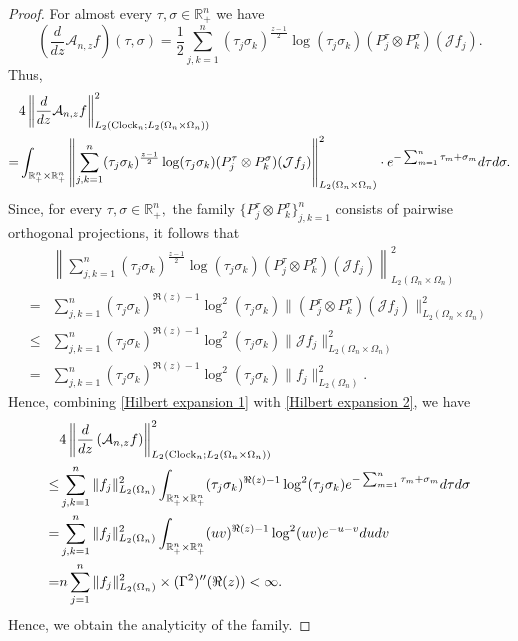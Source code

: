 \documentclass{amsart}
\numberwithin{equation}{section}
\theoremstyle{definition}
\theoremstyle{remark}
\newcommand{\1}{\mathbf 1}
\begin{document}
\begin{proof}
For almost every $\tau,\sigma\in \mathbb{R}^n_+$ we have
$$\left(\frac{d}{dz}\mathcal{A}_{n,z}f\right)(\tau,\sigma)=\frac12\sum_{j,k=1}^n(\tau_j\sigma_k)^{\frac{z-1}{2}}\log(\tau_j\sigma_k)(P_j^{\tau}\otimes P_k^{\sigma})(\mathcal{J}f_j).$$
Thus,
\begin{equation}\label{Hilbert expansion 1}
\begin{split}
&4\left\|\frac{d}{dz}\mathcal{A}_{n,z}f\right\|_{L_2({\rm Clock}_n;L_2(\Omega_n\times\Omega_n))}^2\\
=&\int_{\mathbb{R}^{n}_{+}\times \mathbb{R}^{n}_{+}}\left\|\sum_{j,k=1}^n(\tau_j\sigma_k)^{\frac{z-1}{2}}\log(\tau_j\sigma_k)(P_j^{\tau}\otimes P_k^{\sigma})(\mathcal{J}f_j)\right\|_{L_2(\Omega_n\times\Omega_n)}^{2}\cdot e^{-\sum_{m=1}^n\tau_m+\sigma_m}d\tau d\sigma.
\end{split}
\end{equation}
Since, for every $\tau,\sigma\in\mathbb{R}^n_+,$ the family $\{P^{\tau}_j\otimes P^{\sigma}_k\}_{j,k=1}^n$ consists of pairwise orthogonal projections, it follows that
\begin{equation}\label{Hilbert expansion 2}
\begin{split}
&\left\|\sum_{j,k=1}^n(\tau_j\sigma_k)^{\frac{z-1}{2}}\log(\tau_j\sigma_k)(P_j^{\tau}\otimes P_k^{\sigma})(\mathcal{J}f_j)\right\|_{L_2(\Omega_n\times\Omega_n)}^{2}\\
=&\sum_{j,k=1}^n(\tau_j\sigma_k)^{\Re(z)-1}\log^2(\tau_j\sigma_k)\|(P_j^{\tau}\otimes P_k^{\sigma})(\mathcal{J}f_j)\|_{L_2(\Omega_n\times\Omega_n)}^2\\
\leq &\sum_{j,k=1}^n(\tau_j\sigma_k)^{\Re(z)-1}\log^2(\tau_j\sigma_k)\|\mathcal{J}f_j\|_{L_2(\Omega_n\times\Omega_n)}^2\\
=&\sum_{j,k=1}^n(\tau_j\sigma_k)^{\Re(z)-1}\log^2(\tau_j\sigma_k)\|f_j\|_{L_2(\Omega_n)}^{2}.
\end{split}
\end{equation}
Hence, combining \eqref{Hilbert expansion 1} with \eqref{Hilbert expansion 2}, we have
\begin{align*}
&4\left\|\frac{d}{dz}\left(\mathcal{A}_{n,z}f\right)\right\|_{L_2({\rm Clock}_n;L_2(\Omega_{n}\times\Omega_{n}))}^2\\
\leq &\sum_{j,k=1}^n\|f_j\|_{L_2(\Omega_n)}^{2} \int_{\mathbb{R}^{n}_{+}\times \mathbb{R}^{n}_{+}}(\tau_j\sigma_k)^{\Re(z)-1}\log^2(\tau_j\sigma_k)e^{-\sum_{m=1}^n\tau_m+\sigma_m}d\tau d\sigma\\
=&\sum_{j,k=1}^n\|f_j\|_{L_2(\Omega_n)}^{2}\int_{\mathbb{R}^{n}_{+}\times \mathbb{R}^{n}_{+}}(uv)^{\Re(z)-1}\log^2(uv)e^{-u-v}dudv\\
=&n\sum_{j=1}^n\|f_j\|_{L_2(\Omega_n)}^{2}\times(\Gamma^2)''(\Re(z))<\infty.
\end{align*}
Hence, we obtain the analyticity of the family.
\end{proof}
\end{document}
